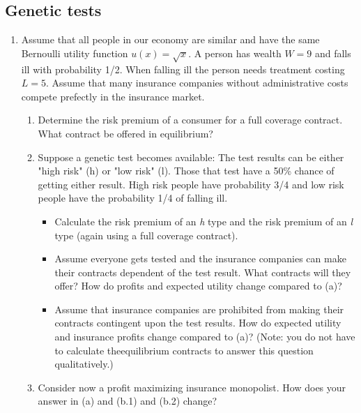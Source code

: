 \documentclass[a4paper]{article}
\begin{document}
\subsection{Genetic tests}
\label{sec:org5d61f90}
\begin{enumerate}[resume]
\item Assume that all people in our economy are similar and have the same Bernoulli utility function \(u(x)=\sqrt{x}\). A person has wealth \(W=9\) and falls ill with probability 1/2. When falling ill the person needs treatment costing \(L=5\). Assume that many insurance companies without administrative costs compete prefectly in the insurance market.
\begin{enumerate}
\item Determine the risk premium of a consumer for a full coverage contract. What contract be offered in equilibrium?
\item Suppose a genetic test becomes available: The test results can be either "high risk" (h) or "low risk" (l). Those that test have a 50\% chance of getting either result. High risk people have probability 3/4 and low risk people have the probability 1/4 of falling ill. 
\begin{itemize}
\item Calculate the risk premium of an \emph{h} type and the risk premium of an \emph{l} type (again using a full coverage contract).
\item Assume everyone gets tested and the insurance companies can make their contracts dependent of the test result. What contracts will they offer? How do profits and expected utility change compared to (a)?
\item Assume that insurance companies are prohibited from making their contracts contingent upon the test results. How do expected utility and insurance profits change compared to (a)? (Note: you do not have to calculate theequilibrium contracts to answer this question qualitatively.)
\end{itemize}
\item Consider now a profit maximizing insurance monopolist. How does your answer in (a) and (b.1) and (b.2) change?
\end{enumerate}
\end{enumerate}
\end{document}
